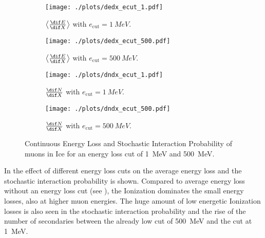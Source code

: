 \begin{figure}
    \centering
    \begin{subfigure}[t]{0.47\textwidth}
        \centering
        \texttt{[image: ./plots/dedx\_ecut\_1.pdf]}
        \caption{$\left\langle \frac{\dif E}{\dif X} \right\rangle$ with $e_{\text{cut}} = \SI{1}{MeV}$.}
        \label{fig:dedx_ecut_1}
        \vspace{0.5cm}
    \end{subfigure}
    \hfill
    \begin{subfigure}[t]{0.47\textwidth}
        \centering
        \texttt{[image: ./plots/dedx\_ecut\_500.pdf]}
        \caption{$\left\langle \frac{\dif E}{\dif X} \right\rangle$ with $e_{\text{cut}} = \SI{500}{MeV}$.}
        \label{fig:dedx_ecut_500}
        \vspace{0.5cm}
    \end{subfigure}
    \begin{subfigure}[t]{0.47\textwidth}
        \centering
        \texttt{[image: ./plots/dndx\_ecut\_1.pdf]}
        \caption{$\frac{\dif N}{\dif X}$ with $e_{\text{cut}} = \SI{1}{MeV}$.}
        \label{fig:dndx_ecut_1}
    \end{subfigure}
    \hfill
    \begin{subfigure}[t]{0.47\textwidth}
        \centering
        \texttt{[image: ./plots/dndx\_ecut\_500.pdf]}
        \caption{$\frac{\dif N}{\dif X}$ with $e_{\text{cut}} = \SI{500}{MeV}$.}
        \label{fig:dndx_ecut_500}
        \vspace{0.5cm}
    \end{subfigure}
    \caption{Continuous Energy Loss and Stochastic Interaction Probability of muons in Ice for an energy loss cut of \SI{1}{MeV} and \SI{500}{MeV}.}
    \label{fig:dedx_dndx_ecuts}
\end{figure}

In  the effect of different energy loss cuts on the average energy loss and the stochastic interaction probability is shown.
Compared to average energy loss without an energy loss cut (see ), the Ionization dominates the small energy losses, also at higher muon energies.
The huge amount of low energetic Ionization losses is also seen in the stochastic interaction probability and the rise of the number of secondaries between the already low cut of \SI{500}{MeV} and the cut at \SI{1}{MeV}.

